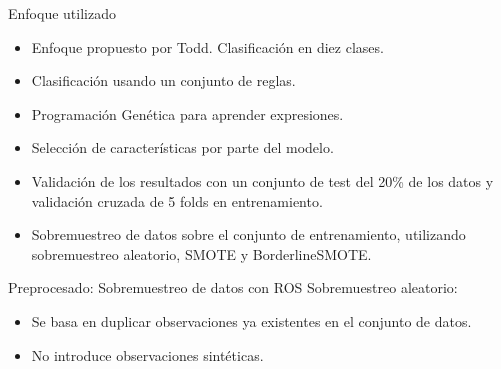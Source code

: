 \documentclass{beamer}
\begin{document}
\begin{frame}{Enfoque utilizado}

	\begin{itemize}
		\item Enfoque propuesto por Todd. Clasificación en diez clases.
		\item Clasificación usando un conjunto de reglas.
		\item Programación Genética para aprender expresiones.
		\item Selección de características por parte del modelo.
		\item Validación de los resultados con un conjunto de test del 20\% de los datos y validación cruzada de 5 folds en entrenamiento.
		\item Sobremuestreo de datos sobre el conjunto de entrenamiento, utilizando sobremuestreo aleatorio, SMOTE y BorderlineSMOTE.
	\end{itemize}

\end{frame}

\begin{frame}{Preprocesado: Sobremuestreo de datos con ROS}
	Sobremuestreo aleatorio:
	\begin{itemize}
		\item Se basa en duplicar observaciones ya existentes en el conjunto de datos.
		\item No introduce observaciones sintéticas.
	\end{itemize}
\end{frame}
\end{document}
